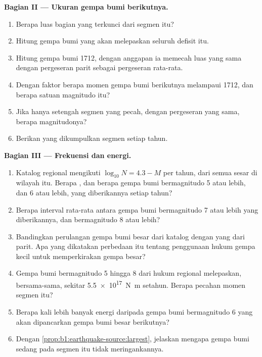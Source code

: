 \begin{problem}
\medskip
\noindent\textbf{Bagian II --- Ukuran gempa bumi berikutnya.}
\begin{enumerate}[resume]
  \item Berapa luas bagian yang terkunci dari segmen itu?
  \item Hitung  gempa bumi yang akan melepaskan seluruh defisit itu.
  \item Hitung  gempa bumi 1712, dengan anggapan ia memecah luas yang sama dengan pergeseran parit sebagai pergeseran rata-rata.
  \item Dengan faktor berapa momen gempa bumi berikutnya melampaui 1712, dan berapa satuan magnitudo itu?
  \item Jika hanya setengah segmen yang pecah, dengan pergeseran yang sama, berapa magnitudonya?
  \item Berikan  yang dikumpulkan segmen setiap tahun.
\end{enumerate}

\medskip
\noindent\textbf{Bagian III --- Frekuensi dan energi.}
\begin{enumerate}[resume]
  \item Katalog regional mengikuti $\log_{10} N = 4.3 - M$ per tahun, dari semua sesar di wilayah itu. Berapa , dan berapa gempa bumi bermagnitudo 5 atau lebih, dan 6 atau lebih, yang diberikannya setiap tahun?
  \item Berapa interval rata-rata antara gempa bumi bermagnitudo 7 atau lebih yang diberikannya, dan bermagnitudo 8 atau lebih?
  \item Bandingkan perulangan gempa bumi besar dari katalog dengan yang dari parit. Apa yang dikatakan perbedaan itu tentang penggunaan hukum gempa kecil untuk memperkirakan gempa besar?
  \item Gempa bumi bermagnitudo 5 hingga 8 dari hukum regional melepaskan, bersama-sama, sekitar \qty{5.5e17}{N.m} setahun. Berapa pecahan momen segmen itu?
  \item Berapa kali lebih banyak energi daripada gempa bumi bermagnitudo 6 yang akan dipancarkan gempa bumi besar berikutnya?
  \item Dengan \cref{prop:b1:earthquake-source:largest}, jelaskan mengapa gempa bumi sedang pada segmen itu tidak meringankannya.
\end{enumerate}


\end{problem}
